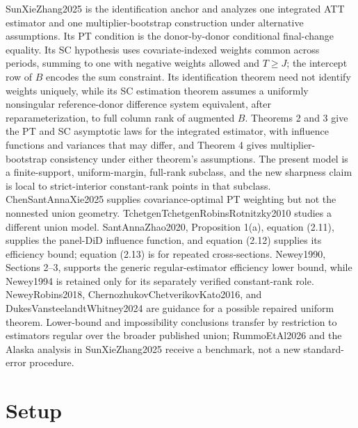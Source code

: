 \documentclass{article}
\begin{document}
SunXieZhang2025 is the identification anchor and analyzes one integrated ATT estimator and one multiplier-bootstrap construction under alternative assumptions. Its PT condition is the donor-by-donor conditional final-change equality. Its SC hypothesis uses covariate-indexed weights common across periods, summing to one with negative weights allowed and \(T\ge J\); the intercept row of \(B\) encodes the sum constraint. Its identification theorem need not identify weights uniquely, while its SC estimation theorem assumes a uniformly nonsingular reference-donor difference system equivalent, after reparameterization, to full column rank of augmented \(B\). Theorems 2 and 3 give the PT and SC asymptotic laws for the integrated estimator, with influence functions and variances that may differ, and Theorem 4 gives multiplier-bootstrap consistency under either theorem's assumptions. The present model is a finite-support, uniform-margin, full-rank subclass, and the new sharpness claim is local to strict-interior constant-rank points in that subclass. ChenSantAnnaXie2025 supplies covariance-optimal PT weighting but not the nonnested union geometry. TchetgenTchetgenRobinsRotnitzky2010 studies a different union model. SantAnnaZhao2020, Proposition 1(a), equation (2.11), supplies the panel-DiD influence function, and equation (2.12) supplies its efficiency bound; equation (2.13) is for repeated cross-sections. Newey1990, Sections 2--3, supports the generic regular-estimator efficiency lower bound, while Newey1994 is retained only for its separately verified constant-rank role. NeweyRobins2018, ChernozhukovChetverikovKato2016, and DukesVansteelandtWhitney2024 are guidance for a possible repaired uniform theorem. Lower-bound and impossibility conclusions transfer by restriction to estimators regular over the broader published union; RummoEtAl2026 and the Alaska analysis in SunXieZhang2025 receive a benchmark, not a new standard-error procedure.

\section{Setup}
\end{document}
